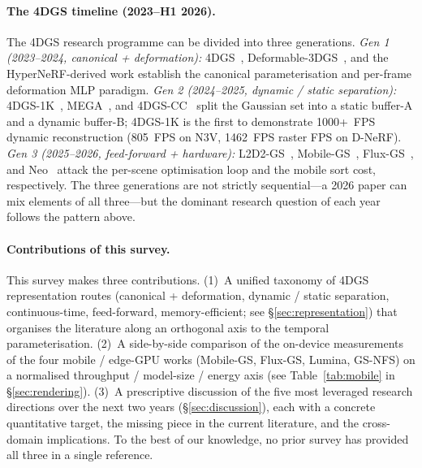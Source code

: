 \paragraph{The 4DGS timeline (2023--H1 2026).}
The 4DGS research programme can be divided into three
generations. \emph{Gen 1 (2023--2024, canonical + deformation):}
4DGS~\cite{wu20244dgs}, Deformable-3DGS~\cite{yang2023deformable3dgs},
and the HyperNeRF-derived work establish the canonical
parameterisation and per-frame deformation MLP paradigm.
\emph{Gen 2 (2024--2025, dynamic / static separation):}
4DGS-1K~\cite{yuan20254dgs1k}, MEGA~\cite{zhang2024mega4dgsacceleration},
and 4DGS-CC~\cite{chen20254dgscc} split the Gaussian set into
a static buffer-A and a dynamic buffer-B; 4DGS-1K is the
first to demonstrate 1000+~FPS dynamic reconstruction
(805~FPS on N3V, 1462~FPS raster FPS on D-NeRF). \emph{Gen 3 (2025--2026,
feed-forward + hardware):} L2D2-GS~\cite{song2026l2d2gs},
Mobile-GS~\cite{du2026mobilegs}, Flux-GS~\cite{du2026fluxgs},
and Neo~\cite{oh2025neo} attack the per-scene optimisation
loop and the mobile sort cost, respectively. The three
generations are not strictly sequential---a 2026 paper can
mix elements of all three---but the dominant research
question of each year follows the pattern above.

\paragraph{Contributions of this survey.}
This survey makes three contributions. (1)~A unified taxonomy
of 4DGS representation routes (canonical + deformation,
dynamic / static separation, continuous-time, feed-forward,
memory-efficient; see \S\ref{sec:representation}) that organises
the literature along an orthogonal axis to the temporal
parameterisation. (2)~A side-by-side comparison of the
on-device measurements of the four mobile / edge-GPU works
(Mobile-GS, Flux-GS, Lumina, GS-NFS) on a normalised
throughput / model-size / energy axis (see Table~\ref{tab:mobile}
in \S\ref{sec:rendering}). (3)~A prescriptive discussion of
the five most leveraged research directions over the next
two years (\S\ref{sec:discussion}), each with a concrete
quantitative target, the missing piece in the current
literature, and the cross-domain implications. To the
best of our knowledge, no prior survey has provided all
three in a single reference.

